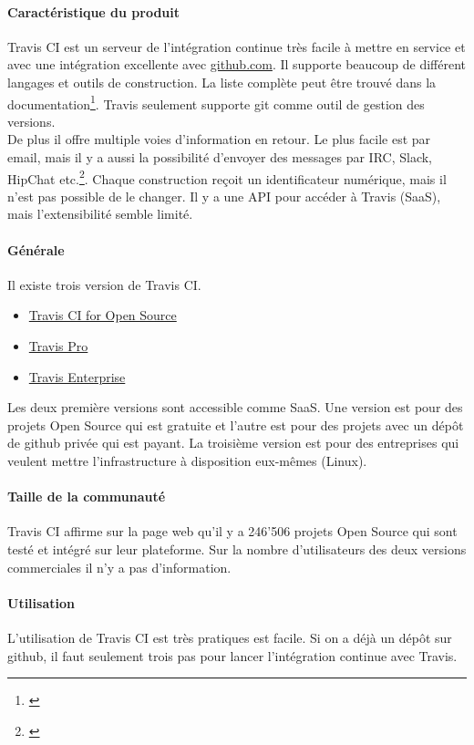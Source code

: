 \paragraph{Caractéristique du produit}
Travis CI est un serveur de l'intégration continue très facile à mettre en service et avec une intégration excellente avec \href{https://github.com/}{github.com}. Il supporte beaucoup de différent langages et outils de construction. La liste complète peut être trouvé dans la documentation\footnote{\citep{traviscidocs}}. Travis seulement supporte git comme outil de gestion des versions.\\
De plus il offre multiple voies d'information en retour. Le plus facile est par email, mais il y a aussi la possibilité d'envoyer des messages par IRC, Slack, HipChat etc.\footnote{\citep{traviscinotification}}. Chaque construction reçoit un identificateur numérique, mais il n'est pas possible de le changer. Il y a une API pour accéder à Travis (SaaS), mais l'extensibilité semble limité.

\paragraph{Générale}
Il existe trois version de Travis CI.
\begin{itemize}
	\item \href{https://travis-ci.org/}{Travis CI for Open Source}
	\item \href{https://travis-ci.com/}{Travis Pro}
	\item \href{https://enterprise.travis-ci.com/}{Travis Enterprise}
\end{itemize}
Les deux première versions sont accessible comme SaaS. Une version est pour des projets Open Source qui est gratuite et l'autre est pour des projets avec un dépôt de github privée qui est payant. La troisième version est pour des entreprises qui veulent mettre l'infrastructure à disposition eux-mêmes (Linux).

\paragraph{Taille de la communauté}
Travis CI affirme sur la page web qu'il y a 246'506 projets Open Source qui sont testé et intégré sur leur plateforme. Sur la nombre d'utilisateurs des deux versions commerciales il n'y a pas d'information.

\paragraph{Utilisation}
L'utilisation de Travis CI est très pratiques est facile. Si on a déjà un dépôt sur github, il faut seulement trois pas pour lancer l'intégration continue avec Travis.

